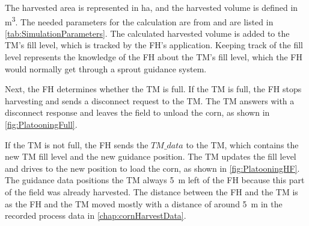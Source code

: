 The harvested area is represented in \si{\hectare}, and
the harvested volume is defined in \si{\cubic\metre}.
The needed parameters for the calculation are from \cite{faustzahlen2018} and are listed in \autoref{tab:SimulationParameters}.
The calculated harvested volume is added to the \ac{TM}'s fill level, which is tracked by the \ac{FH}'s application.
Keeping track of the fill level represents the knowledge of the \ac{FH} about the \ac{TM}'s fill level, which the \ac{FH} would
normally get through a sprout guidance system.

Next, the \ac{FH} determines whether the \ac{TM} is full.
If the \ac{TM} is full, the \ac{FH} stops harvesting and sends a disconnect request to the \ac{TM}.
The \ac{TM} answers with a disconnect response and leaves the field to unload the corn, as shown in \autoref{fig:PlatooningFull}.



If the \ac{TM} is not full, the \ac{FH} sends the $TM\_data$ to the \ac{TM},
which contains the new \ac{TM} fill level and the new guidance position.
The \ac{TM} updates the fill level and drives to the new position to load the corn, as shown in \autoref{fig:PlatooningHF}.
The guidance data positions the \ac{TM} always \SI{5}{\metre} left of the \ac{FH} because this part of the field was already harvested.
The distance between the \ac{FH} and the \ac{TM} is  as the \ac{FH} and the \ac{TM} moved mostly with a distance of around \SI{5}{\metre} in
the recorded process data in \autoref{chap:cornHarvestData}.


